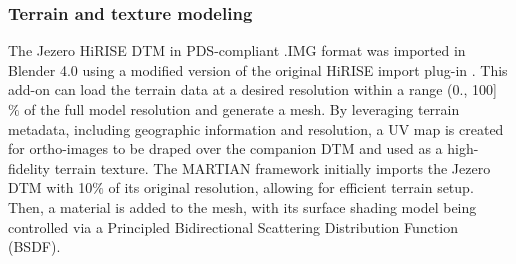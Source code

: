 \subsubsection{Terrain and texture modeling}
\label{subsubsec:terrain_modeling}
The Jezero HiRISE DTM in PDS-compliant .IMG format was imported in Blender 4.0 using a modified version of the original HiRISE import plug-in \cite{BlenderHiRISEDTMImporter}. This add-on can load the terrain data at a desired resolution within a range (0., 100] $\%$ of the full model resolution and generate a mesh. By leveraging terrain metadata, including geographic information and resolution, a UV map is created for ortho-images to be draped over the companion DTM and used as a high-fidelity terrain texture. 
The MARTIAN framework initially imports the Jezero DTM with 10$\%$ of its original resolution, allowing for efficient terrain setup. Then, a material is added to the mesh, with its surface shading model being controlled via a Principled Bidirectional Scattering Distribution Function (BSDF).

